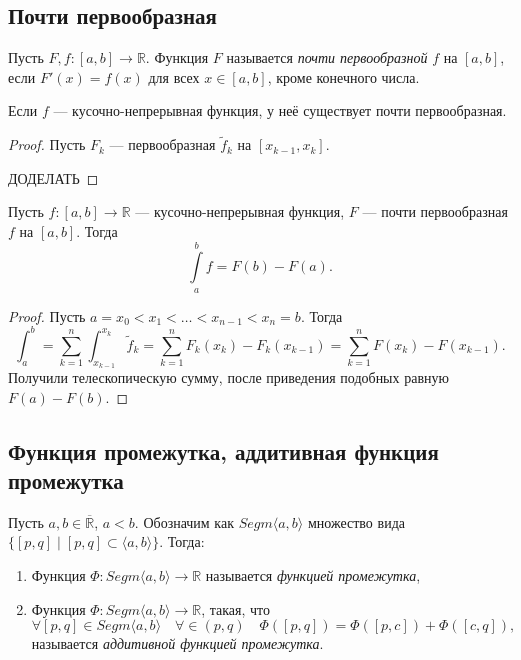 \subsection{Почти первообразная}

\begin{definition}
	Пусть \(F, f \colon [a, b] \to \mathbb{R}\). Функция \(F\) называется \textit{почти первообразной} \(f\) на \([a, b]\), если \(F'(x) = f(x)\) для всех \(x \in [a, b]\), кроме конечного числа.
\end{definition}

\begin{remark}
	Если \(f\) --- кусочно-непрерывная функция, у неё существует почти первообразная.
\end{remark}

\begin{proof}
	Пусть \(F_k\) --- первообразная \(\widetilde{f}_k\) на \([x_{k - 1}, x_k]\).
	
	ДОДЕЛАТЬ
\end{proof}

\begin{remark}
	Пусть \(f \colon [a, b] \to \mathbb{R}\) --- кусочно-непрерывная функция, \(F\) --- почти первообразная \(f\) на \([a, b]\). Тогда \[
		\int\limits_a^b f = F(b) - F(a).
	\]
\end{remark}

\begin{proof}
	Пусть \(a = x_0 < x_1 < \ldots < x_{n - 1} < x_n = b\). Тогда \[
		\int_a^b = \sum_{k = 1}^n \int_{x_{k - 1}}^{x_k} \widetilde{f}_k = \sum_{k = 1}^n F_k(x_k) - F_k (x_{k - 1}) = \sum_{k = 1}^n F(x_k) - F(x_{k - 1}).
	\]
	Получили телескопическую сумму, после приведения подобных равную \(F(a) - F(b)\).
\end{proof}

\subsection{Функция промежутка, аддитивная функция промежутка}

\begin{definition}
	Пусть \(a, b \in \overline{\mathbb{R}}\), \(a < b\). Обозначим как \(Segm \langle a, b \rangle\) множество вида \(\{[p, q] \mid [p, q] \subset \langle a, b \rangle\}\). Тогда:
	\begin{enumerate}
		\item Функция \(\Phi \colon Segm \langle a, b \rangle \to \mathbb{R}\) называется \textit{функцией промежутка},
		\item Функция \(\Phi \colon Segm \langle a, b \rangle \to \mathbb{R}\), такая, что \[
			\forall [p, q] \in Segm \langle a, b \rangle \quad \forall \in (p, q) \quad \Phi([p, q]) = \Phi([p, c]) + \Phi([c, q]),
		\]
		называется \textit{аддитивной функцией промежутка}.
	\end{enumerate}
\end{definition}

